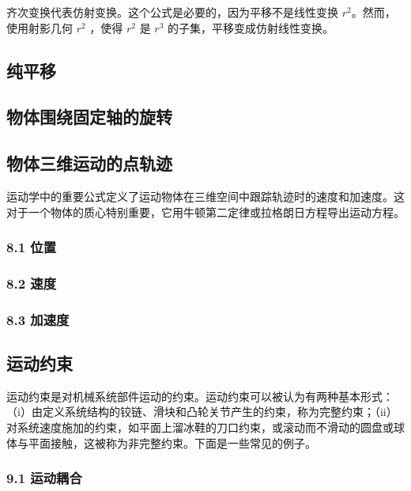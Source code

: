 齐次变换代表仿射变换。这个公式是必要的，因为平移不是线性变换 $ r^2 $。然而，使用射影几何 $r^2 $ ，使得 $ r^2 $ 是 $ r^3 $ 的子集，平移变成仿射线性变换。

\subsection{纯平移}



\subsection{ 物体围绕固定轴的旋转}



\subsection{物体三维运动的点轨迹}

运动学中的重要公式定义了运动物体在三维空间中跟踪轨迹时的速度和加速度。这对于一个物体的质心特别重要，它用牛顿第二定律或拉格朗日方程导出运动方程。

\subsubsection{8.1 位置}



\subsubsection{8.2 速度}



\subsubsection{8.3 加速度}



\subsection{运动约束}

运动约束是对机械系统部件运动的约束。运动约束可以被认为有两种基本形式：（i）由定义系统结构的铰链、滑块和凸轮关节产生的约束，称为完整约束；（ii）对系统速度施加的约束，如平面上溜冰鞋的刀口约束，或滚动而不滑动的圆盘或球体与平面接触，这被称为非完整约束。下面是一些常见的例子。

\subsubsection{9.1 运动耦合}

